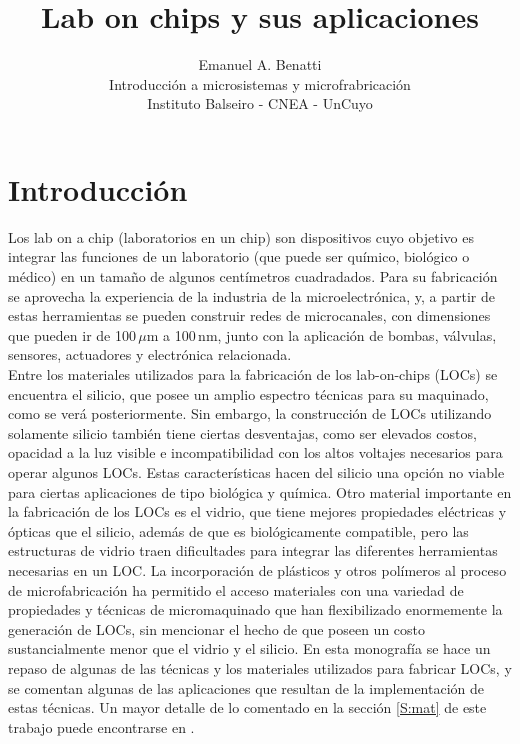 \documentclass[a4paper, 12pt]{article}
\begin{document}
\renewcommand{\tablename}{Tabla}
\title{Lab on chips y sus aplicaciones}
\author{Emanuel A. Benatti\\ Introducción a microsistemas y microfrabricación\\Instituto Balseiro - CNEA - UnCuyo}
\maketitle
%
\section{Introducción}\label{S:intro}
Los lab on a chip (laboratorios en un chip) son dispositivos cuyo objetivo es integrar las funciones de un laboratorio (que puede ser químico, biológico o médico) en un tamaño de algunos centímetros cuadradados. Para su fabricación se aprovecha la experiencia de la industria de la microelectrónica, y, a partir de estas herramientas se pueden construir redes de microcanales, con dimensiones que pueden ir de 100\,$\mu$m a 100\,nm, junto con la aplicación de bombas, válvulas, sensores, actuadores y electrónica relacionada\nocite{Abgrall2007}.\\

Entre los materiales utilizados para la fabricación de los lab-on-chips (LOCs) se encuentra el silicio, que posee un amplio espectro técnicas para su maquinado, como se verá posteriormente. Sin embargo, la construcción de LOCs utilizando solamente silicio también tiene ciertas desventajas, como ser elevados costos, opacidad a la luz visible e incompatibilidad con los altos voltajes necesarios para operar algunos LOCs. Estas características hacen del silicio una opción no viable para ciertas aplicaciones de tipo biológica y química. Otro material importante en la fabricación de los LOCs es el vidrio, que tiene mejores propiedades eléctricas y ópticas que el silicio, además de que es biológicamente compatible, pero las estructuras de vidrio traen dificultades para integrar las diferentes herramientas necesarias en un LOC. La incorporación de plásticos y otros polímeros al proceso de microfabricación ha permitido el acceso materiales con una variedad de propiedades y técnicas de micromaquinado que han flexibilizado enormemente la generación de LOCs, sin mencionar el hecho de que poseen un costo sustancialmente menor que el vidrio  y el silicio. En esta monografía se hace un repaso de algunas de las técnicas y los materiales utilizados para fabricar LOCs, y se comentan algunas de las aplicaciones que resultan de la implementación de estas técnicas. Un mayor detalle de lo comentado en la sección \ref{S:mat} de este trabajo puede encontrarse en \cite{Abgrall2007}.\\
 \begin{figure}[h!]
   \begin{center}

   \end{center}
   \caption{}
   \label{fig:}
 \end{figure}
 
\end{document}
